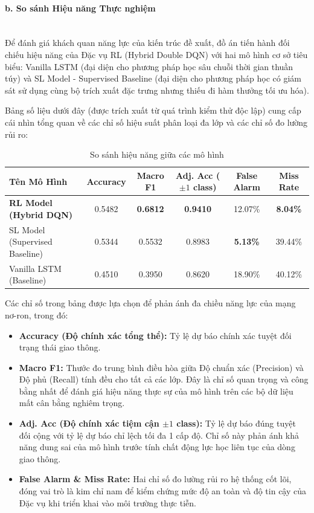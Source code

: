\paragraph{b. So sánh Hiệu năng Thực nghiệm} \mbox{} \\
Để đánh giá khách quan năng lực của kiến trúc đề xuất, đồ án tiến hành đối chiếu hiệu năng của Đặc vụ RL (Hybrid Double DQN) với hai mô hình cơ sở tiêu biểu: Vanilla LSTM (đại diện cho phương pháp học sâu chuỗi thời gian thuần túy) và SL Model - Supervised Baseline (đại diện cho phương pháp học có giám sát sử dụng cùng bộ trích xuất đặc trưng nhưng thiếu đi hàm thưởng tối ưu hóa).

Bảng số liệu dưới đây (được trích xuất từ quá trình kiểm thử độc lập) cung cấp cái nhìn tổng quan về các chỉ số hiệu suất phân loại đa lớp và các chỉ số đo lường rủi ro:

\begin{table}[H]
\centering
\begin{tabular}{|l|c|c|c|c|c|}
\hline
\textbf{Tên Mô Hình} & \textbf{Accuracy} & \textbf{Macro F1} & \textbf{Adj. Acc ($\pm 1$ class)} & \textbf{False Alarm} & \textbf{Miss Rate} \\ \hline
\textbf{RL Model (Hybrid DQN)} & 0.5482 & \textbf{0.6812} & \textbf{0.9410} & 12.07\% & \textbf{8.04\%} \\ \hline
SL Model (Supervised Baseline) & 0.5344 & 0.5532 & 0.8983 & \textbf{5.13\%} & 39.44\% \\ \hline
Vanilla LSTM (Baseline) & 0.4510 & 0.3950 & 0.8620 & 18.90\% & 40.12\% \\ \hline
\end{tabular}
\caption{So sánh hiệu năng giữa các mô hình}
\label{tab:5_perf}
\end{table}

Các chỉ số trong bảng được lựa chọn để phản ánh đa chiều năng lực của mạng nơ-ron, trong đó:
\begin{itemize}
    \item \textbf{Accuracy (Độ chính xác tổng thể):} Tỷ lệ dự báo chính xác tuyệt đối trạng thái giao thông.
    \item \textbf{Macro F1:} Thước đo trung bình điều hòa giữa Độ chuẩn xác (Precision) và Độ phủ (Recall) tính đều cho tất cả các lớp. Đây là chỉ số quan trọng và công bằng nhất để đánh giá hiệu năng thực sự của mô hình trên các bộ dữ liệu mất cân bằng nghiêm trọng.
    \item \textbf{Adj. Acc (Độ chính xác tiệm cận $\pm 1$ class):} Tỷ lệ dự báo đúng tuyệt đối cộng với tỷ lệ dự báo chỉ lệch tối đa 1 cấp độ. Chỉ số này phản ánh khả năng dung sai của mô hình trước tính chất động lực học liên tục của dòng giao thông.
    \item \textbf{False Alarm \& Miss Rate:} Hai chỉ số đo lường rủi ro hệ thống cốt lõi, đóng vai trò là kim chỉ nam để kiểm chứng mức độ an toàn và độ tin cậy của Đặc vụ khi triển khai vào môi trường thực tiễn.
\end{itemize}

